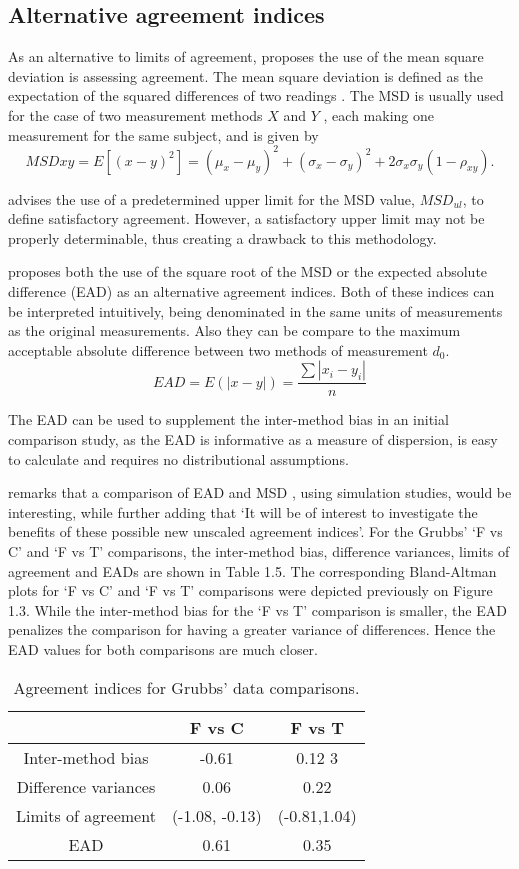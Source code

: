 \documentclass[Chap3bmain.tex]{subfiles}
\begin{document}
\subsection{Alternative agreement indices}
As an alternative to limits of agreement, \citet{lin2002} proposes the use of
the mean square deviation is assessing agreement. The mean square
deviation is defined as the expectation of the squared differences
of two readings . The MSD is usually used for the case of two
measurement methods $X$ and $Y$ , each making one measurement for
the same subject, and is given by
\[
MSDxy = E[(x - y)^2]  = (\mu_{x} - \mu_{y})^2 + (\sigma_{x} -
\sigma_{y})^2 + 2\sigma_{x}\sigma_{y}(1-\rho_{xy}).
\]


\citet{Barnhart} advises the use of a predetermined upper limit
for the MSD value, $MSD_{ul}$, to define satisfactory agreement.
However, a satisfactory upper limit may not be properly
determinable, thus creating a drawback to this methodology.


\citet{Barnhart} proposes both the use of the square root of the
MSD or the expected absolute difference (EAD) as an alternative agreement indices. Both of these indices can be interpreted intuitively, being denominated in the same units of measurements as the original
measurements. Also they can be compare to the maximum acceptable
absolute difference between two methods of measurement $d_{0}$.
\[
EAD = E(|x - y|) = \frac{\sum |x_{i}- y_{i}|}{n}
\]

The EAD can be used to supplement the inter-method bias in an
initial comparison study, as the EAD is informative as a measure
of dispersion, is easy to calculate and requires no distributional
assumptions.

\citet{Barnhart} remarks that a comparison of EAD and MSD , using
simulation studies, would be interesting, while further adding
that `It will be of interest to investigate the benefits of these
possible new unscaled agreement indices'. For the Grubbs' `F vs C' and `F vs T' comparisons, the inter-method bias, difference variances, limits of agreement and EADs are shown
in Table 1.5. The corresponding Bland-Altman plots for `F vs C' and `F vs T' comparisons were depicted previously on Figure 1.3. While the inter-method bias for the `F vs T' comparison is smaller, the EAD penalizes the comparison for having a greater variance of differences. Hence the EAD values for both comparisons are much closer.
\begin{table}[ht]
\begin{center}
\begin{tabular}{|c|c|c|}
  \hline
 & F vs C & F vs T  \\
  \hline
Inter-method bias & -0.61 & 0.12 3 \\
Difference variances & 0.06 & 0.22  \\
Limits of agreement & (-1.08,	-0.13) & (-0.81,1.04) \\
  EAD & 0.61 & 0.35  \\
   \hline
\end{tabular}
\caption{Agreement indices for Grubbs' data comparisons.}
\end{center}
\end{table}
\end{document}
